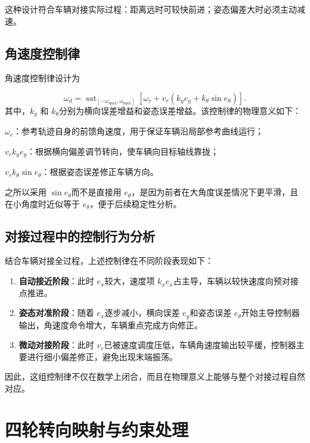 这种设计符合车辆对接实际过程：距离远时可较快前进；姿态偏差大时必须主动减速\cite{ref19}。

\subsection{角速度控制律}

角速度控制律设计为

\begin{equation}
\omega_d=\operatorname{sat}_{[-\omega_{\max},\omega_{\max}]}
\left[\omega_r+v_r\left(k_ye_y+k_\theta\sin e_\theta\right)\right].
\label{eq:angular_control}
\end{equation}
其中，\(k_{y}\) 和
\(k_{\theta}\)分别为横向误差增益和姿态误差增益。该控制律的物理意义如下\cite{ref17,ref26,ref27,ref28}：

\(\omega_{r}\)：参考轨迹自身的前馈角速度，用于保证车辆沿局部参考曲线运行；

\(v_{r}k_{y}e_{y}\)：根据横向偏差调节转向，使车辆向目标轴线靠拢；

\(v_{r}k_{\theta}\sin e_{\theta}\)：根据姿态误差修正车辆方向。

之所以采用 \(\sin e_{\theta}\)而不是直接用
\(e_{\theta}\)，是因为前者在大角度误差情况下更平滑，且在小角度时近似等于
\(e_{\theta}\)，便于后续稳定性分析。

\subsection{对接过程中的控制行为分析}

结合车辆对接全过程，上述控制律在不同阶段表现如下：
\begin{enumerate}[label=（\arabic*）,leftmargin=4em]
\item \textbf{自动接近阶段}：此时 \(e_{x}\)较大，速度项 \(k_{x}e_{x}\)占主导，车辆以较快速度向预对接点推进。
\item \textbf{姿态对准阶段}：随着 \(e_{x}\)逐步减小，横向误差 \(e_{y}\)和姿态误差 \(e_{\theta}\)开始主导控制器输出，角速度命令增大，车辆重点完成方向修正。
\item \textbf{微动对接阶段}：此时 \(v_{r}\)已被速度调度压低，车辆角速度输出较平缓，控制器主要进行细小偏差修正，避免出现末端振荡。
\end{enumerate}

因此，这组控制律不仅在数学上闭合，而且在物理意义上能够与整个对接过程自然对应。

\section{四轮转向映射与约束处理}

